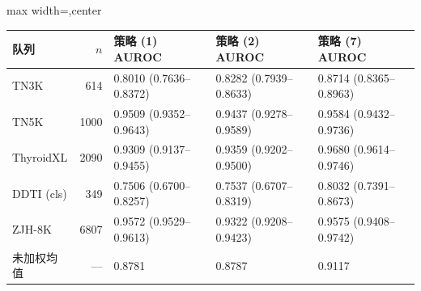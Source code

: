 \begin{responsetable}
\caption{}
\begin{adjustbox}{max width=\textwidth,center}
\begin{tabular}{@{}l r l l l@{}}
\toprule
队列 & $n$ & 策略 (1) AUROC & 策略 (2) AUROC & 策略 (7) AUROC \\
\midrule
TN3K & 614 & 0.8010 (0.7636--0.8372) & 0.8282 (0.7939--0.8633) & 0.8714 (0.8365--0.8963) \\
TN5K & 1000 & 0.9509 (0.9352--0.9643) & 0.9437 (0.9278--0.9589) & 0.9584 (0.9432--0.9736) \\
ThyroidXL & 2090 & 0.9309 (0.9137--0.9455) & 0.9359 (0.9202--0.9500) & 0.9680 (0.9614--0.9746) \\
DDTI (cls) & 349 & 0.7506 (0.6700--0.8257) & 0.7537 (0.6707--0.8319) & 0.8032 (0.7391--0.8673) \\
ZJH-8K & 6807 & 0.9572 (0.9529--0.9613) & 0.9322 (0.9208--0.9423) & 0.9575 (0.9408--0.9742) \\
\midrule
未加权均值 & --- & 0.8781 & 0.8787 & 0.9117 \\
\bottomrule
\end{tabular}
\end{adjustbox}
\end{responsetable}
